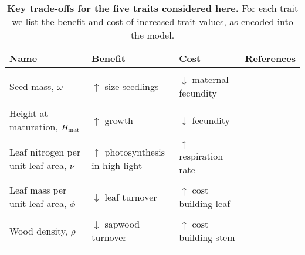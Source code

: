 \documentclass[a4paper,11pt]{article}
\begin{document}
\begin{table}[ht]
 \caption{\textbf{Key trade-offs for the five traits considered here.}
For each trait we list the benefit and cost of increased trait values, as encoded into the {\plant} model.
 }
\centering
{\footnotesize
\raggedright
  \begin{tabular}{p{3cm}p{3cm}p{3cm}p{4cm}}
  \\
  \hline
  Name &  Benefit & Cost & References \\
  \hline
  \\
  Seed mass, $\omega$ & $\uparrow$ size seedlings & $\downarrow$  maternal fecundity & \citet{Moles-2006}\\
  \\
  Height at maturation, $H_{{\rm mat}}$  & $\uparrow$ growth & $\downarrow$ fecundity & \citet{Thomas-2011, Wenk-2015}\\
\\
  Leaf nitrogen per unit leaf area, $\nu$ & $\uparrow$ photosynthesis in high light & $\uparrow$ respiration rate & \citet{Wright-2004}\\
  \\
  Leaf mass per unit leaf area, $\phi$ & $\downarrow$ leaf turnover & $\uparrow$ cost building leaf & \citet{Wright-2004}\\
  \\
  Wood density, $\rho$ & $\downarrow$ sapwood turnover & $\uparrow$ cost building stem & \citet{Chave-2009}\\
  \\
  \hline
  \end{tabular}
}
\label{tab:traits}
\end{table}

\newpage
\end{document}
